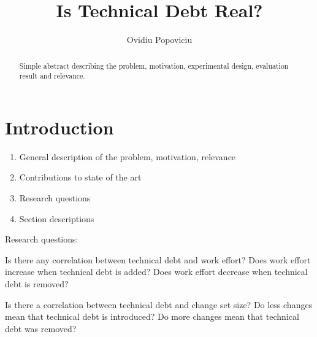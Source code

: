 \documentclass{mpaper}
\begin{document}
\title{Is Technical Debt Real?}
\author{Ovidiu Popoviciu}


\maketitle


\begin{abstract}
Simple abstract describing the problem, motivation, experimental design,
evaluation result and relevance.
\end{abstract}

\section{Introduction}
\label{introduction}

\begin{enumerate}
  \item General description of the problem, motivation, relevance
  \item Contributions to state of the art 
  \item Research questions
  \item Section descriptions
\end{enumerate}

Research questions:

Is there any correlation between technical debt and work effort?
Does work effort increase when technical debt is added?
Does work effort decrease when technical debt is removed?

Is there a correlation between technical debt and change set size?
Do less changes mean that technical debt is introduced?
Do more changes mean that technical debt was removed? 


\end{document}
